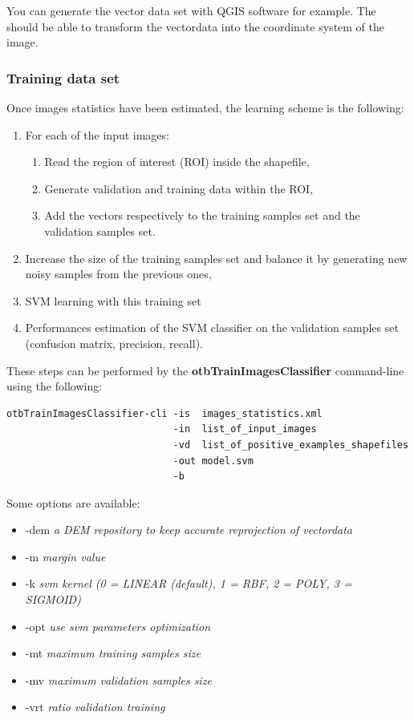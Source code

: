 You can generate the vector data set with QGIS software for example. The \app should be able to transform the vectordata into the coordinate system of the image. 

\subsubsection{Training data set}

Once images statistics have been estimated, the learning scheme is the following:
\begin{enumerate}
  \item For each of the input images:
  \begin{enumerate}
    \item Read the region of interest (ROI) inside the shapefile,
    \item Generate validation and training data within the ROI,
    \item Add the vectors respectively to the training samples set and the validation samples set.
  \end{enumerate}
  \item Increase the size of the training samples set and balance it by generating new noisy samples from the previous ones,
  \item SVM learning with this training set
  \item Performances estimation of the SVM classifier on the validation samples set (confusion matrix, precision, recall).
\end{enumerate}

These steps can be performed by the \textbf{otbTrainImagesClassifier} command-line using the following:

\begin{verbatim}
otbTrainImagesClassifier-cli -is  images_statistics.xml 
                             -in  list_of_input_images 
                             -vd  list_of_positive_examples_shapefiles
                             -out model.svm
                             -b
\end{verbatim}

Some options are available:
\begin{itemize}
\item -dem \textit{a DEM repository to keep accurate reprojection of vectordata}
\item -m   \textit{margin value}
\item -k   \textit{svm kernel (0 = LINEAR (default), 1 = RBF,  2 = POLY, 3 = SIGMOID) }
\item -opt \textit{use svm parameters optimization}
\item -mt  \textit{maximum training samples size} 
\item -mv  \textit{maximum validation samples size}
\item -vrt \textit{ratio validation training}
\end{itemize}

